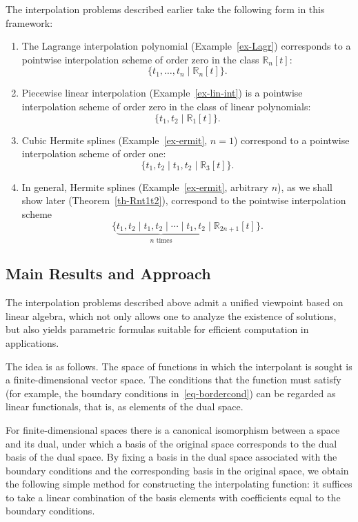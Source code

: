 \documentclass{article}
\theoremstyle{definition}
\theoremstyle{definition}
\numberwithin{figure}{section}
\newcommand{\1}{\mathbf{1}}
\begin{document}
The interpolation problems described earlier take the following form in this framework:
\begin{enumerate}
    \item The Lagrange interpolation polynomial (Example~\ref{ex-Lagr}) corresponds to a pointwise interpolation scheme of order zero in the class $\mathbb{R}_n[t]$:
    \[
        \{t_1,\ldots,t_n \mid \mathbb{R}_n[t]\}.
    \]

    \item Piecewise linear interpolation (Example~\ref{ex-lin-int}) is a pointwise interpolation scheme of order zero in the class of linear polynomials:
    \[
        \{t_1, t_2 \mid \mathbb{R}_1[t]\}.
    \]

    \item Cubic Hermite splines (Example~\ref{ex-ermit}, $n=1$) correspond to a pointwise interpolation scheme of order one:
    \[
        \{t_1, t_2 \mid t_1, t_2  \mid \mathbb{R}_3[t]\}.
    \]

    \item In general, Hermite splines (Example~\ref{ex-ermit}, arbitrary $n$), as we shall show later (Theorem~\ref{th-Rnt1t2}), correspond to the pointwise interpolation scheme
    \[
        \{\underbrace{t_1, t_2 \mid t_1, t_2 \mid \cdots \mid t_1, t_2}_{n \text{ times}} \mid \mathbb{R}_{2n+1}[t]\}.
    \]
\end{enumerate}

\subsection{Main Results and Approach}

The interpolation problems described above admit a unified viewpoint based on linear algebra, which not only allows one to analyze the existence of solutions, but also yields parametric formulas suitable for efficient computation in applications.

The idea is as follows. The space of functions in which the interpolant is sought is a finite-dimensional vector space. The conditions that the function must satisfy (for example, the boundary conditions in~\eqref{eq-bordercond}) can be regarded as linear functionals, that is, as elements of the dual space.

For finite-dimensional spaces there is a canonical isomorphism between a space and its dual, under which a basis of the original space corresponds to the dual basis of the dual space. By fixing a basis in the dual space associated with the boundary conditions and the corresponding basis in the original space, we obtain the following simple method for constructing the interpolating function: it suffices to take a linear com\-bination of the  basis elements with coefficients equal to the boun\-dary conditions.
\end{document}

